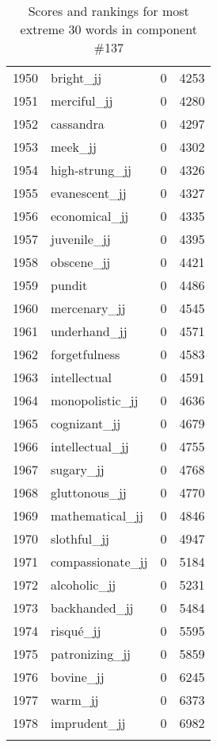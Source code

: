 \begin{longtable}[!htbp]{| rlr@{.}l |}
    1950 & bright\_jj & 0 & 4253 \\
    1951 & merciful\_jj & 0 & 4280 \\
    1952 & cassandra & 0 & 4297 \\
    1953 & meek\_jj & 0 & 4302 \\
    1954 & high-strung\_jj & 0 & 4326 \\
    1955 & evanescent\_jj & 0 & 4327 \\
    1956 & economical\_jj & 0 & 4335 \\
    1957 & juvenile\_jj & 0 & 4395 \\
    1958 & obscene\_jj & 0 & 4421 \\
    1959 & pundit & 0 & 4486 \\
    1960 & mercenary\_jj & 0 & 4545 \\
    1961 & underhand\_jj & 0 & 4571 \\
    1962 & forgetfulness & 0 & 4583 \\
    1963 & intellectual & 0 & 4591 \\
    1964 & monopolistic\_jj & 0 & 4636 \\
    1965 & cognizant\_jj & 0 & 4679 \\
    1966 & intellectual\_jj & 0 & 4755 \\
    1967 & sugary\_jj & 0 & 4768 \\
    1968 & gluttonous\_jj & 0 & 4770 \\
    1969 & mathematical\_jj & 0 & 4846 \\
    1970 & slothful\_jj & 0 & 4947 \\
    1971 & compassionate\_jj & 0 & 5184 \\
    1972 & alcoholic\_jj & 0 & 5231 \\
    1973 & backhanded\_jj & 0 & 5484 \\
    1974 & risqué\_jj & 0 & 5595 \\
    1975 & patronizing\_jj & 0 & 5859 \\
    1976 & bovine\_jj & 0 & 6245 \\
    1977 & warm\_jj & 0 & 6373 \\
    1978 & imprudent\_jj & 0 & 6982 \\
    \hline
    \caption{Scores and rankings for most extreme 30 words in component \#137} \\
\end{longtable}
